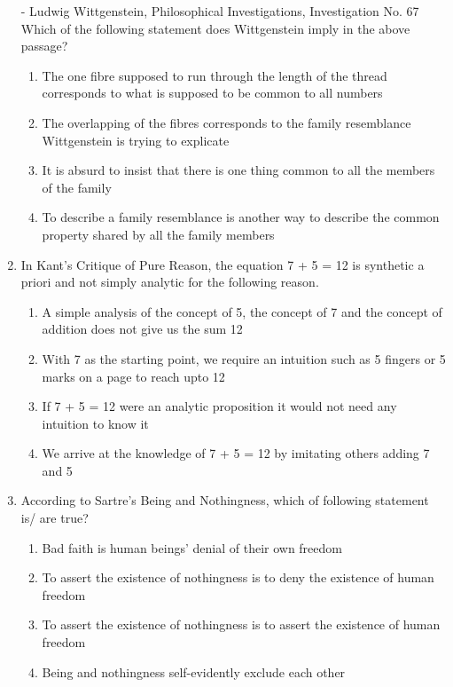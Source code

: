 \documentclass[12pt]{article}
\theoremstyle{remark}
\begin{document}
\begin{enumerate}
- Ludwig Wittgenstein, Philosophical Investigations, Investigation No. 67
Which of the following statement does Wittgenstein imply in the above passage?
\begin{enumerate}
    \item The one fibre supposed to run through the length of the thread corresponds to what is supposed to be common to all numbers
    \item The overlapping of the fibres corresponds to the family resemblance Wittgenstein is trying to explicate
    \item It is absurd to insist that there is one thing common to all the members of the family
    \item To describe a family resemblance is another way to describe the common property shared by all the family members
\end{enumerate}
\hfill{}
\item In Kant’s Critique of Pure Reason, the equation 7 + 5 = 12 is synthetic a priori and not simply analytic for the following reason.
\begin{enumerate}
    \item A simple analysis of the concept of 5, the concept of 7 and the concept of addition does not give us the sum 12
    \item With 7 as the starting point, we require an intuition such as 5 fingers or 5 marks on a page to reach upto 12
    \item If 7 + 5 = 12 were an analytic proposition it would not need any intuition to know it
    \item We arrive at the knowledge of 7 + 5 = 12 by imitating others adding 7 and 5
\end{enumerate}
\hfill{}
\item According to Sartre’s Being and Nothingness, which of following statement is/ are true?
\begin{enumerate}
    \item Bad faith is human beings’ denial of their own freedom
    \item To assert the existence of nothingness is to deny the existence of human freedom
    \item To assert the existence of nothingness is to assert the existence of human freedom
    \item Being and nothingness self-evidently exclude each other 
\end{enumerate}
\hfill{}

\end{enumerate}
\end{document}
